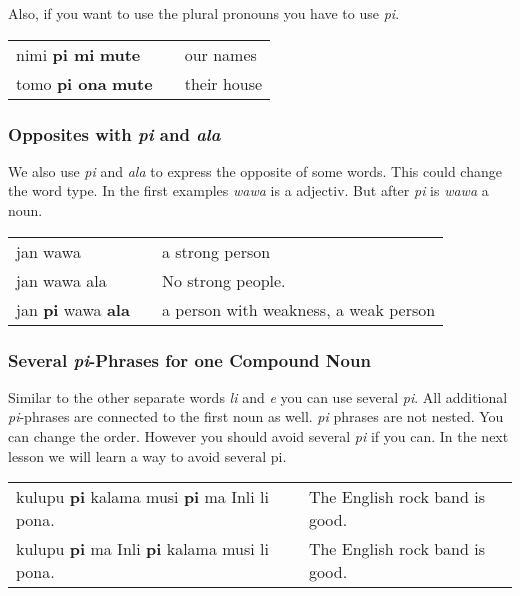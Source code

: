 Also, if you want to use the plural pronouns you have to use \textit{pi}.

\begin{supertabular}{p{5,5cm}|ll}
nimi \textbf{pi mi} \textbf{mute} && our names \\
tomo \textbf{pi ona} \textbf{mute} && their house \\
\end{supertabular}  

\subsubsection*{Opposites with \textit{pi} and \textit{ala}}

We also use \textit{pi} and \textit{ala} to express the opposite of some words. 
This could change the word type. In the first examples \textit{wawa} is a
adjectiv. But after \textit{pi} is \textit{wawa} a noun.

\begin{supertabular}{p{5,5cm}|ll}
jan wawa && a strong person \\
jan wawa ala && No strong people. \\ 
jan \textbf{pi} wawa \textbf{ala} && a person with weakness, a weak person \\
\end{supertabular}  

\subsubsection*{Several \textit{pi}-Phrases for one Compound Noun} 

Similar to the other separate words \textit{li} and \textit{e} you can use several \textit{pi}. 
All additional \textit{pi}-phrases are connected to the first noun as well. 
\textit{pi} phrases are not nested. 
You can change the order. 
However you should avoid several \textit{pi} if you can. 
In the next lesson we will learn a way to avoid several pi.

\begin{supertabular}{p{5,5cm}|ll}
kulupu \textbf{pi} kalama musi \textbf{pi} ma Inli li pona. &&  The English rock band is good. \\ 
kulupu \textbf{pi} ma Inli \textbf{pi} kalama musi li pona. &&  The English rock band is good. \\ 
\end{supertabular}

